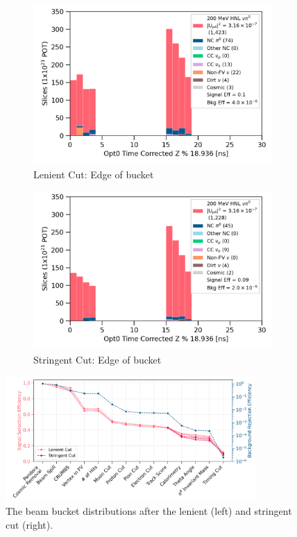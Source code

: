 \begin{figure}[htbp!]
\begin{subfigure}[b]{0.495\textwidth}
	    \includegraphics[width=\textwidth]{bb_lenient_edge}
            \caption{Lenient Cut: Edge of bucket}%
	    \label{fig:bb_edge_loose}
        \end{subfigure}
        \hfill
        \begin{subfigure}[b]{0.495\textwidth}   
            \centering 
	    \includegraphics[width=\textwidth]{bb_stringent_edge}
            \caption{Stringent Cut: Edge of bucket}%
	    \label{fig:bb_edge_strict}
        \end{subfigure}
        \caption{
		The beam bucket distributions after the lenient (left) and stringent cut (right).
	}
        \label{fig:timing_cut}
\vspace{0.5cm}
    \centering 
    \includegraphics[width=0.85\textwidth]{peff_band}

\end{figure}
